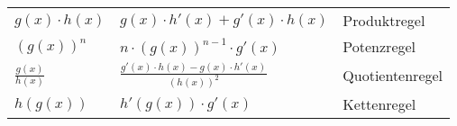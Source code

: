 \documentclass{sciposter}
\begin{document}
\begin{multicols}{2}
{\begin{table}[]
\begin{tabular}{@{} p{} p{} p{} @{}}
			\midrule
			$g(x) \cdot h(x)$ & $g(x) \cdot h'(x) + g'(x) \cdot h(x)$ & Produktregel\\
			$\left(g(x)\right)^n$ & $n \cdot \left( g(x) \right)^{n-1} \cdot g'(x)$ & Potenzregel\\
			$\frac{g(x)}{h(x)}$ & $\frac{ g'(x) \cdot h(x) - g(x)\cdot h'(x)}{\left(h(x)\right) ^2}$ & Quotientenregel\\
			$h(g(x))$ & $h'(g(x)) \cdot g'(x)$ & Kettenregel\\
			\bottomrule
		\end{tabular}
	\end{table}
}




\vfill\null
\columnbreak



\end{multicols}
\end{document}
